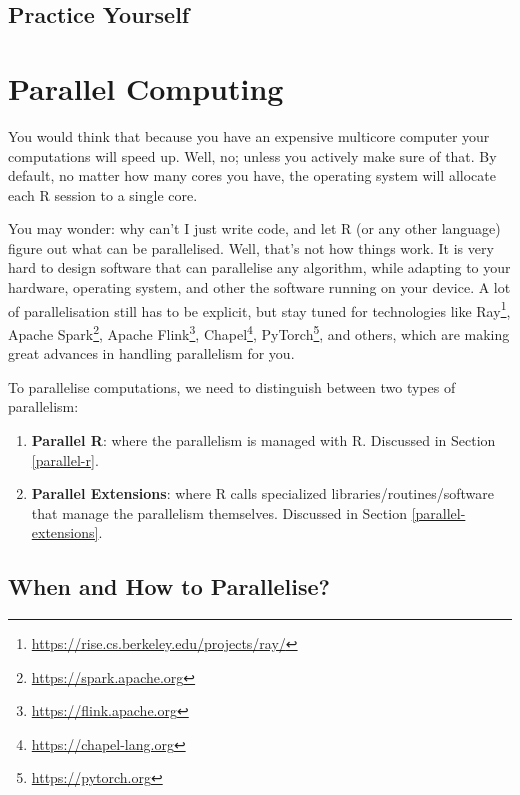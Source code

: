 \documentclass[]{book}
\providecommand{\tightlist}{%
  \setlength{\itemsep}{0pt}\setlength{\parskip}{0pt}}
\renewcommand{\href}[2]{#2\footnote{\url{#1}}}
\theoremstyle{definition}
\theoremstyle{definition}
\theoremstyle{definition}
\theoremstyle{remark}
\begin{document}
\hypertarget{practice-yourself-11}{%
\section{Practice Yourself}\label{practice-yourself-11}}

\hypertarget{parallel}{%
\chapter{Parallel Computing}\label{parallel}}

You would think that because you have an expensive multicore computer your computations will speed up.
Well, no; unless you actively make sure of that.
By default, no matter how many cores you have, the operating system will allocate each R session to a single core.

You may wonder: why can't I just write code, and let R (or any other language) figure out what can be parallelised.
Well, that's not how things work.
It is very hard to design software that can parallelise any algorithm, while adapting to your hardware, operating system, and other the software running on your device.
A lot of parallelisation still has to be explicit, but stay tuned for technologies like \href{https://rise.cs.berkeley.edu/projects/ray/}{Ray}, \href{https://spark.apache.org}{Apache Spark}, \href{https://flink.apache.org}{Apache Flink}, \href{https://chapel-lang.org}{Chapel}, \href{https://pytorch.org}{PyTorch}, and others, which are making great advances in handling parallelism for you.

To parallelise computations, we need to distinguish between two types of parallelism:

\begin{enumerate}
\def\labelenumi{\arabic{enumi}.}
\tightlist
\item
  \textbf{Parallel R}: where the parallelism is managed with R. Discussed in Section \ref{parallel-r}.
\item
  \textbf{Parallel Extensions}: where R calls specialized libraries/routines/software that manage the parallelism themselves. Discussed in Section \ref{parallel-extensions}.
\end{enumerate}

\hypertarget{when-and-how-to-parallelise}{%
\section{When and How to Parallelise?}\label{when-and-how-to-parallelise}}
\end{document}
